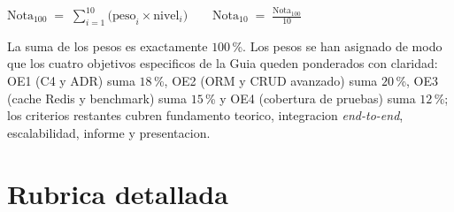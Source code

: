 \documentclass[11pt,a4paper]{article}
\begin{document}
\begin{center}
    $\displaystyle \text{Nota}_{100} \;=\; \sum_{i=1}^{10} \bigl(\text{peso}_{i} \times \text{nivel}_{i}\bigr) \qquad \text{Nota}_{10} \;=\; \frac{\text{Nota}_{100}}{10}$
\end{center}

La suma de los pesos es exactamente $100$\,\%. Los pesos se han asignado de modo que los cuatro objetivos especificos de la Guia queden ponderados con claridad: OE1 (C4 y ADR) suma $18$\,\%, OE2 (ORM y CRUD avanzado) suma $20$\,\%, OE3 (cache Redis y benchmark) suma $15$\,\% y OE4 (cobertura de pruebas) suma $12$\,\%; los criterios restantes cubren fundamento teorico, integracion \emph{end-to-end}, escalabilidad, informe y presentacion.

\section{Rubrica detallada}
\end{document}
